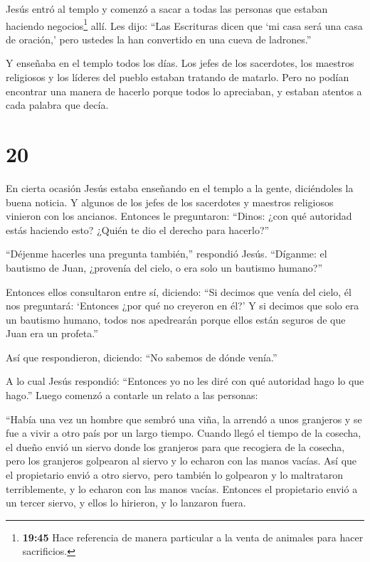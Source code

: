  Jesús entró al templo y comenzó a sacar a todas las
personas que estaban haciendo negocios\footnote{\textbf{19:45} Hace
  referencia de manera particular a la venta de animales para hacer
  sacrificios.} allí.  Les dijo: ``Las Escrituras dicen que
`mi casa será una casa de oración,' pero ustedes la han convertido en
una cueva de ladrones.''

 Y enseñaba en el templo todos los días. Los jefes de los
sacerdotes, los maestros religiosos y los líderes del pueblo estaban
tratando de matarlo.  Pero no podían encontrar una manera
de hacerlo porque todos lo apreciaban, y estaban atentos a cada palabra
que decía.

\hypertarget{section-19}{%
\section{20}\label{section-19}}

 En cierta ocasión Jesús estaba enseñando en el templo a la
gente, diciéndoles la buena noticia. Y algunos de los jefes de los
sacerdotes y maestros religiosos vinieron con los ancianos. 
Entonces le preguntaron: ``Dinos: ¿con qué autoridad estás haciendo
esto? ¿Quién te dio el derecho para hacerlo?''

 ``Déjenme hacerles una pregunta también,'' respondió Jesús.
``Díganme:  el bautismo de Juan, ¿provenía del cielo, o era
solo un bautismo humano?''

 Entonces ellos consultaron entre sí, diciendo: ``Si decimos
que venía del cielo, él nos preguntará: `Entonces ¿por qué no creyeron
en él?'  Y si decimos que solo era un bautismo humano, todos
nos apedrearán porque ellos están seguros de que Juan era un profeta.''

 Así que respondieron, diciendo: ``No sabemos de dónde
venía.''

 A lo cual Jesús respondió: ``Entonces yo no les diré con
qué autoridad hago lo que hago.''  Luego comenzó a contarle
un relato a las personas:

``Había una vez un hombre que sembró una viña, la arrendó a unos
granjeros y se fue a vivir a otro país por un largo tiempo.
 Cuando llegó el tiempo de la cosecha, el dueño envió un
siervo donde los granjeros para que recogiera de la cosecha, pero los
granjeros golpearon al siervo y lo echaron con las manos vacías.
 Así que el propietario envió a otro siervo, pero también
lo golpearon y lo maltrataron terriblemente, y lo echaron con las manos
vacías.  Entonces el propietario envió a un tercer siervo,
y ellos lo hirieron, y lo lanzaron fuera.


